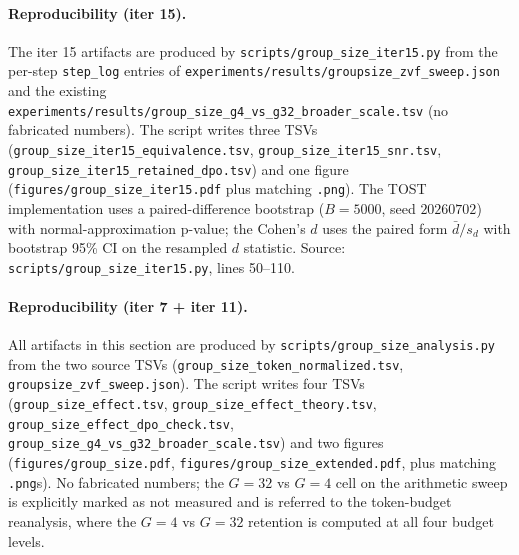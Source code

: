 \paragraph{Reproducibility (iter 15).}
The iter 15 artifacts are produced by
\texttt{scripts/group\_size\_iter15.py} from the per-step
\texttt{step\_log} entries of
\texttt{experiments/results/groupsize\_zvf\_sweep.json} and the
existing
\texttt{experiments/results/group\_size\_g4\_vs\_g32\_broader\_scale.tsv}
(no fabricated numbers). The script writes three TSVs
(\texttt{group\_size\_iter15\_equivalence.tsv},
\texttt{group\_size\_iter15\_snr.tsv},
\texttt{group\_size\_iter15\_retained\_dpo.tsv}) and one figure
(\texttt{figures/group\_size\_iter15.pdf} plus matching
\texttt{.png}). The TOST implementation uses a paired-difference
bootstrap ($B{=}5000$, seed $20260702$) with normal-approximation
p-value; the Cohen's $d$ uses the paired form
$\bar d / s_d$ with bootstrap 95\% CI on the resampled
$d$ statistic. Source: \texttt{scripts/group\_size\_iter15.py},
lines 50--110.


\paragraph{Reproducibility (iter 7 + iter 11).}
All artifacts in this section are produced by
\texttt{scripts/group\_size\_analysis.py} from the two source TSVs
(\texttt{group\_size\_token\_normalized.tsv},
\texttt{groupsize\_zvf\_sweep.json}). The script writes four TSVs
(\texttt{group\_size\_effect.tsv}, \texttt{group\_size\_effect\_theory.tsv},
\texttt{group\_size\_effect\_dpo\_check.tsv},
\texttt{group\_size\_g4\_vs\_g32\_broader\_scale.tsv}) and two figures
(\texttt{figures/group\_size.pdf}, \texttt{figures/group\_size\_extended.pdf},
plus matching \texttt{.png}s). No fabricated numbers; the
$G{=}32$ vs $G{=}4$ cell on the arithmetic sweep is explicitly marked
as not measured and is referred to the token-budget reanalysis, where
the $G{=}4$ vs $G{=}32$ retention is computed at all four budget
levels.


